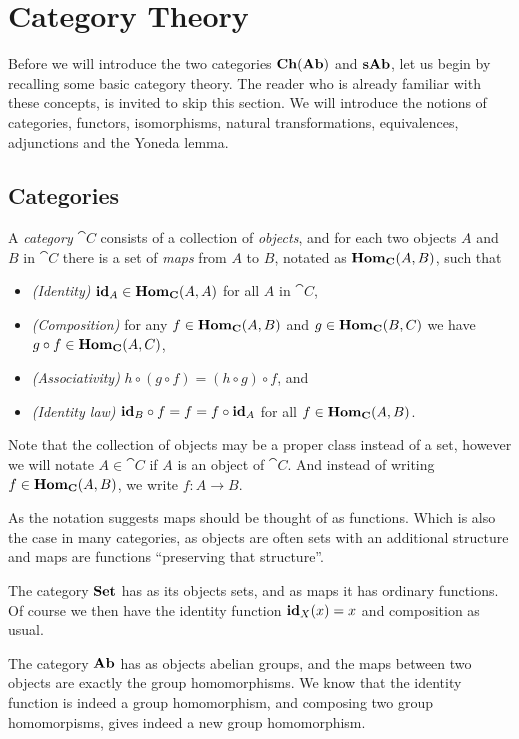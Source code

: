 \section{Category Theory}
\label{sec:Category Theory}
Before we will introduce the two categories $\mathbf{Ch}(\mathbf{Ab})$ and $\mathbf{sAb}$, let us begin by recalling some basic category theory. The reader who is already familiar with these concepts, is invited to skip this section. We will introduce the notions of categories, functors, isomorphisms, natural transformations, equivalences, adjunctions and the Yoneda lemma.

\subsection{Categories}
\begin{definition}
	A \emph{category} $\cat{C}$ consists of a collection of \emph{objects}, and for each two objects $A$ and $B$ in $\cat{C}$ there is a set of \emph{maps}  from $A$ to $B$, notated as $\mathbf{Hom}_{\mathbf{C}}(A, B)$, such that
	\begin{itemize}
		\item \emph{(Identity)}
			$\mathbf{id}_A \in \mathbf{Hom}_{\mathbf{C}}(A, A)$ for all $A$ in $\cat{C}$,
		\item \emph{(Composition)}
			for any $f \in \mathbf{Hom}_{\mathbf{C}}(A, B)$ and $g \in \mathbf{Hom}_{\mathbf{C}}(B, C)$ we have $g \circ f \in \mathbf{Hom}_{\mathbf{C}}(A, C)$,
		\item \emph{(Associativity)}
			$h \circ (g \circ f) = (h \circ g) \circ f$, and
		\item \emph{(Identity law)}
			$\mathbf{id}_B \circ f = f = f \circ \mathbf{id}_A$ for all $f \in \mathbf{Hom}_{\mathbf{C}}(A, B)$.
	\end{itemize}
\end{definition}

Note that the collection of objects may be a proper class instead of a set, however we will notate $A \in \cat{C}$ if $A$ is an object of $\cat{C}$. And instead of writing $f \in \mathbf{Hom}_{\mathbf{C}}(A, B)$, we write $f: A \to B$.

As the notation suggests maps should be thought of as functions. Which is also the case in many categories, as objects are often sets with an additional structure and maps are functions ``preserving that structure''.

\begin{example}
	The category $\mathbf{Set}$ has as its objects sets, and as maps it has ordinary functions. Of course we then have the identity function $\mathbf{id}_X(x) = x$ and composition as usual.
\end{example}
\begin{example}
	The category $\mathbf{Ab}$ has as objects abelian groups, and the maps between two objects are exactly the group homomorphisms. We know that the identity function is indeed a group homomorphism, and composing two group homomorpisms, gives indeed a new group homomorphism.
\end{example}

